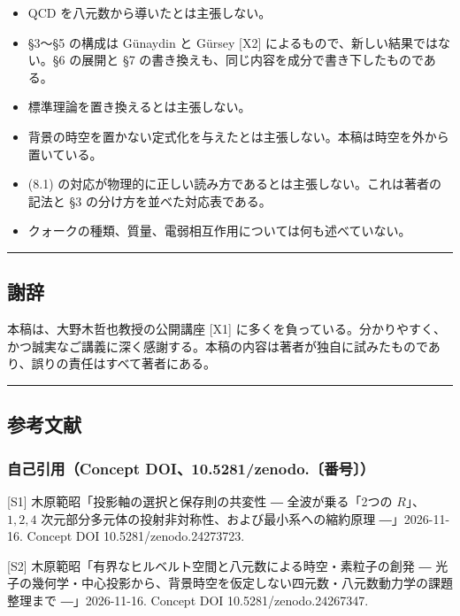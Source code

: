 \documentclass[
  a4paper,
]{ltjsarticle}
\providecommand{\tightlist}{%
  \setlength{\itemsep}{0pt}\setlength{\parskip}{0pt}}
\begin{document}
\begin{itemize}
\tightlist
\item
  QCD を八元数から導いたとは主張しない。
\item
  §3〜§5 の構成は Günaydin と Gürsey {[}X2{]}
  によるもので、新しい結果ではない。§6 の展開と §7
  の書き換えも、同じ内容を成分で書き下したものである。
\item
  標準理論を置き換えるとは主張しない。
\item
  背景の時空を置かない定式化を与えたとは主張しない。本稿は時空を外から置いている。
\item
  (8.1)
  の対応が物理的に正しい読み方であるとは主張しない。これは著者の記法と
  §3 の分け方を並べた対応表である。
\item
  クォークの種類、質量、電弱相互作用については何も述べていない。
\end{itemize}

\begin{center}\rule{0.5\linewidth}{0.5pt}\end{center}

\subsection{謝辞}\label{ux8b1dux8f9e}

本稿は、大野木哲也教授の公開講座 {[}X1{]}
に多くを負っている。分かりやすく、かつ誠実なご講義に深く感謝する。本稿の内容は著者が独自に試みたものであり、誤りの責任はすべて著者にある。

\begin{center}\rule{0.5\linewidth}{0.5pt}\end{center}

\subsection{参考文献}\label{ux53c2ux8003ux6587ux732e}

\subsubsection{自己引用（Concept
DOI、10.5281/zenodo.〔番号〕）}\label{ux81eaux5df1ux5f15ux7528concept-doi10.5281zenodo.ux756aux53f7}

{[}S1{]} 木原範昭「投影軸の選択と保存則の共変性 ― 全波が乗る「2つの
\(R\)」、\(1, 2, 4\)
次元部分多元体の投射非対称性、および最小系への縮約原理 ―」2026-11-16.
Concept DOI 10.5281/zenodo.24273723.

{[}S2{]} 木原範昭「有界なヒルベルト空間と八元数による時空・素粒子の創発
―
光子の幾何学・中心投影から、背景時空を仮定しない四元数・八元数動力学の課題整理まで
―」2026-11-16. Concept DOI 10.5281/zenodo.24267347.
\end{document}
